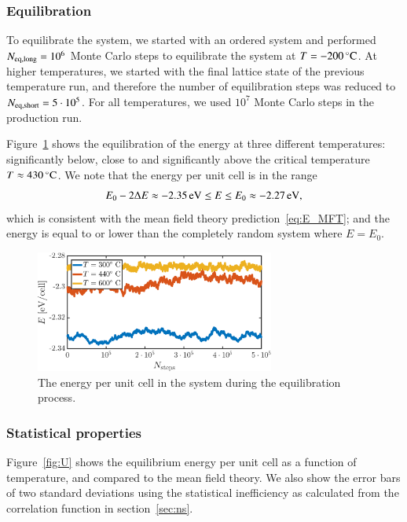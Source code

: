 \subsubsection*{Equilibration}
To equilibrate the system, we started with an ordered system and performed $N_{\rm eq, long} = 10^6$ Monte Carlo steps to equilibrate the system at $T = \unit[-200]{^\circ C}$. At higher temperatures, we started with the final lattice state of the previous temperature run, and therefore the number of equilibration steps was reduced to $N_{\rm eq, short} = 5 \cdot 10^5$. For all temperatures, we used $10^7$ Monte Carlo steps in the production run. 

Figure~\ref{fig:T2:equil} shows the equilibration of the energy at three different temperatures: significantly below, close to and significantly above the critical temperature $T \approx \unit[430]{^\circ C}$. 
We note that the energy per unit cell is in the range 
\begin{equation}
E_0 - 2 \Delta E \approx \unit[-2.35 ]{eV}\leq E\leq  E_0  \approx \unit[-2.27]{eV},
\label{eq:E-range}
\end{equation}
which is consistent with the mean field theory prediction~\eqref{eq:E_MFT}; and the energy is equal to or lower than the completely random system where $E = E_0$. 

\begin{figure}[!ht]
\begin{center}
  \includegraphics[width=0.7\textwidth]{../figures/equilibration} 
  \caption{The energy per unit cell in the system during the equilibration process.}
  \label{fig:T2:equil}
\end{center}
\end{figure}

\subsubsection*{Statistical properties}
Figure~\ref{fig:U} shows the equilibrium energy per unit cell as a function of temperature, and compared to the mean field theory. We also show the error bars of two standard deviations using the statistical inefficiency  as calculated from the correlation function in section~\ref{sec:ns}. 


